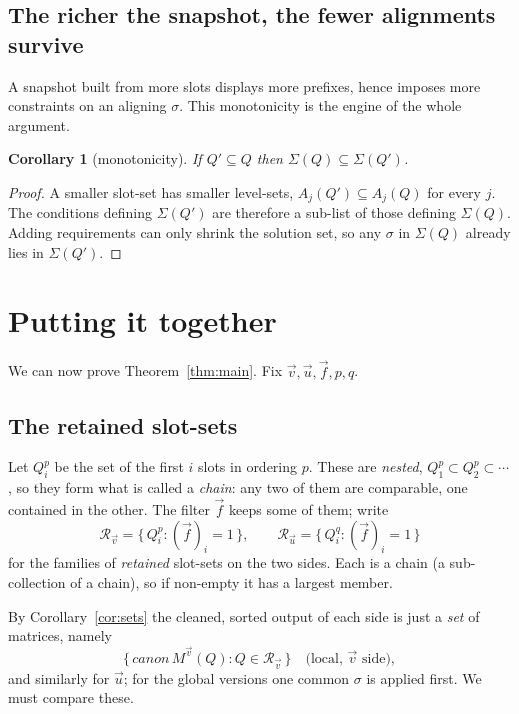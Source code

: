 \documentclass{article}
\newtheorem{corollary}[theorem]{Corollary}
\begin{document}
\subsection*{The richer the snapshot, the fewer alignments survive}

A snapshot built from more slots displays more prefixes, hence imposes more
constraints on an aligning $\sigma$.  This monotonicity is the engine of the whole
argument.

\begin{corollary}[monotonicity]\label{cor:mono}
If $Q'\subseteq Q$ then $\Sigma(Q)\subseteq\Sigma(Q')$.
\end{corollary}

\begin{proof}
A smaller slot-set has smaller level-sets, $A_j(Q')\subseteq A_j(Q)$ for every $j$.
The conditions defining $\Sigma(Q')$ are therefore a sub-list of those defining
$\Sigma(Q)$.  Adding requirements can only shrink the solution set, so any
$\sigma$ in $\Sigma(Q)$ already lies in $\Sigma(Q')$.
\end{proof}


\section{Putting it together}
\label{sec:solution}

We can now prove Theorem~\ref{thm:main}.  Fix $\vec v,\vec u,\vec f,p,q$.

\subsection*{The retained slot-sets}

\label{def:retained}Let $Q^p_i$ be the set of the first $i$ slots in ordering $p$.  These are
\emph{nested}, $Q^p_1\subset Q^p_2\subset\cdots$, so they form what is called a
\emph{chain}: any two of them are comparable, one contained in the other.  The
filter $\vec f$ keeps some of them; write
\[
\mathcal R_{\vec v}=\{\,Q^p_i:(\vec f)_i=1\,\},
\qquad
\mathcal R_{\vec u}=\{\,Q^q_i:(\vec f)_i=1\,\}
\]
for the families of \emph{retained} slot-sets on the two sides.  Each is a chain
(a sub-collection of a chain), so if non-empty it has a largest member.

By Corollary~\ref{cor:sets} the cleaned, sorted output of each side is just a
\emph{set} of matrices, namely
\[
\{\,canon\,M^{\vec v}(Q):Q\in\mathcal R_{\vec v}\,\}
\quad\text{(local, $\vec v$ side)},
\]
and similarly for $\vec u$; for the global versions one common $\sigma$ is applied
first.  We must compare these.
\end{document}
